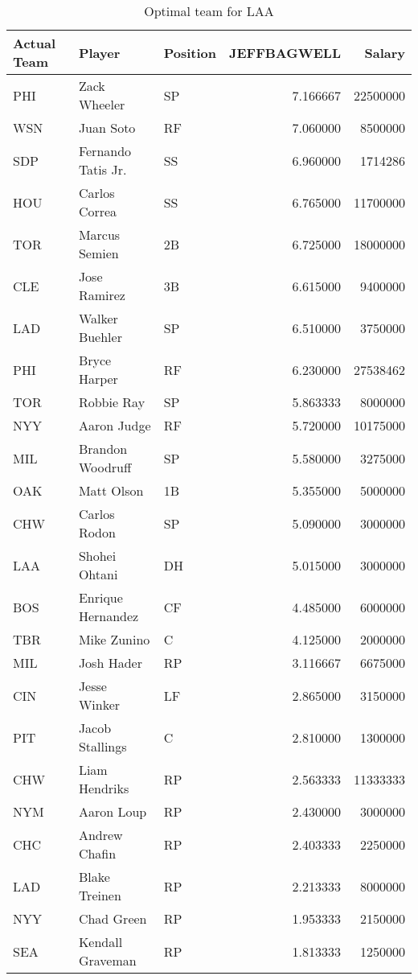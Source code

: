 \begin{table}

\caption{Optimal team for LAA}
\centering
\begin{tabular}[t]{l|l|l|r|r}
\hline
Actual Team & Player & Position & JEFFBAGWELL & Salary\\
\hline
PHI & Zack Wheeler & SP & 7.166667 & 22500000\\
\hline
WSN & Juan Soto & RF & 7.060000 & 8500000\\
\hline
SDP & Fernando Tatis Jr. & SS & 6.960000 & 1714286\\
\hline
HOU & Carlos Correa & SS & 6.765000 & 11700000\\
\hline
TOR & Marcus Semien & 2B & 6.725000 & 18000000\\
\hline
CLE & Jose Ramirez & 3B & 6.615000 & 9400000\\
\hline
LAD & Walker Buehler & SP & 6.510000 & 3750000\\
\hline
PHI & Bryce Harper & RF & 6.230000 & 27538462\\
\hline
TOR & Robbie Ray & SP & 5.863333 & 8000000\\
\hline
NYY & Aaron Judge & RF & 5.720000 & 10175000\\
\hline
MIL & Brandon Woodruff & SP & 5.580000 & 3275000\\
\hline
OAK & Matt Olson & 1B & 5.355000 & 5000000\\
\hline
CHW & Carlos Rodon & SP & 5.090000 & 3000000\\
\hline
LAA & Shohei Ohtani & DH & 5.015000 & 3000000\\
\hline
BOS & Enrique Hernandez & CF & 4.485000 & 6000000\\
\hline
TBR & Mike Zunino & C & 4.125000 & 2000000\\
\hline
MIL & Josh Hader & RP & 3.116667 & 6675000\\
\hline
CIN & Jesse Winker & LF & 2.865000 & 3150000\\
\hline
PIT & Jacob Stallings & C & 2.810000 & 1300000\\
\hline
CHW & Liam Hendriks & RP & 2.563333 & 11333333\\
\hline
NYM & Aaron Loup & RP & 2.430000 & 3000000\\
\hline
CHC & Andrew Chafin & RP & 2.403333 & 2250000\\
\hline
LAD & Blake Treinen & RP & 2.213333 & 8000000\\
\hline
NYY & Chad Green & RP & 1.953333 & 2150000\\
\hline
SEA & Kendall Graveman & RP & 1.813333 & 1250000\\
\hline
\end{tabular}
\end{table}
